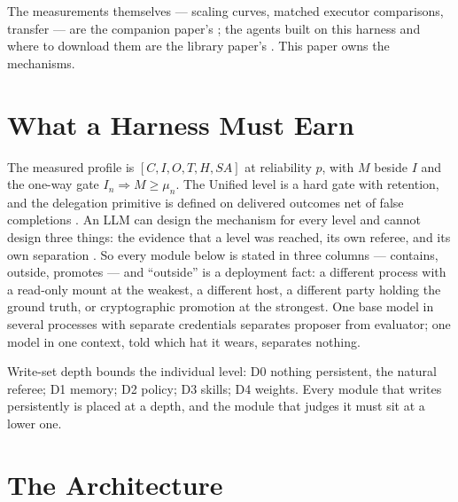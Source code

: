 \documentclass[11pt]{article}
\theoremstyle{definition}
\begin{document}
The measurements themselves --- scaling curves, matched executor comparisons, transfer --- are the companion paper's \citep{yang2026scaling}; the agents built on this harness and where to download them are the library paper's \citep{yang2026library}. This paper owns the mechanisms.

\section{What a Harness Must Earn}\label{sec:requires}

The measured profile is $[C,I,O,T,H,SA]$ at reliability $p$, with $M$ beside $I$ and the one-way gate $I_n \Rightarrow M \ge \mu_n$. The Unified level is a hard gate with retention, and the delegation primitive is defined on delivered outcomes net of false completions \citep{yang2026unified}. An LLM can design the mechanism for every level and cannot design three things: the evidence that a level was reached, its own referee, and its own separation \citep{yang2026designing}. So every module below is stated in three columns --- contains, outside, promotes --- and ``outside'' is a deployment fact: a different process with a read-only mount at the weakest, a different host, a different party holding the ground truth, or cryptographic promotion at the strongest. One base model in several processes with separate credentials separates proposer from evaluator; one model in one context, told which hat it wears, separates nothing.

Write-set depth bounds the individual level: D0 nothing persistent, the natural referee; D1 memory; D2 policy; D3 skills; D4 weights. Every module that writes persistently is placed at a depth, and the module that judges it must sit at a lower one.

\section{The Architecture}\label{sec:arch}
\end{document}
